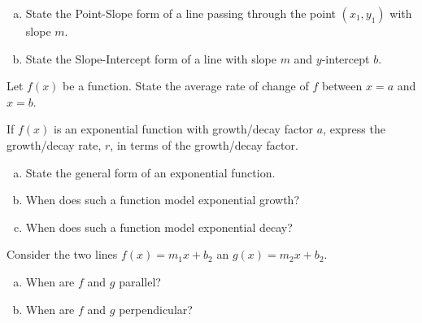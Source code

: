 \documentclass[12pt]{amsart}
\begin{document}
\begin{thm}[4 Points]\label{ex1}
  \begin{enumerate}[(a)]
  \item
    State the Point-Slope form of a line passing through the point $(x_1, y_1)$ with slope $m$.
    \vspace{1in}
  \item
    State the Slope-Intercept form of a line with slope $m$ and $y$-intercept $b$.
    \vspace{3in}
  \end{enumerate}
\end{thm}

\begin{thm}[6 Points]\label{ex2}
  Let $f(x)$ be a function.
  State the average rate of change of $f$ between $x = a$ and $x = b$.
\end{thm}

\newpage

\begin{thm}[5 Points]\label{ex3}
  If $f(x)$ is an exponential function with growth/decay factor $a$, express the growth/decay rate, $r$, in terms of the growth/decay factor.
  \vspace{1in}
\end{thm}

\begin{thm}[3 Points]\label{ex4}
  \begin{enumerate}[(a)]
  \item
    State the general form of an exponential function.
    \vspace{1in}
    \item
      When does such a function model exponential growth?
      \vspace{1in}
    \item
      When does such a function model exponential decay?
      \vspace{1in}
  \end{enumerate}
\end{thm}

\begin{thm}[2 Points]
  Consider the two lines $f(x) = m_1x + b_2$ an $g(x) = m_2x + b_2$.
  \begin{enumerate}[(a)]
  \item
    When are $f$ and $g$ parallel?
    \vspace{1in}
  \item
    When are $f$ and $g$ perpendicular?
    \vspace{1in}
  \end{enumerate}
\end{thm}
\end{document}
